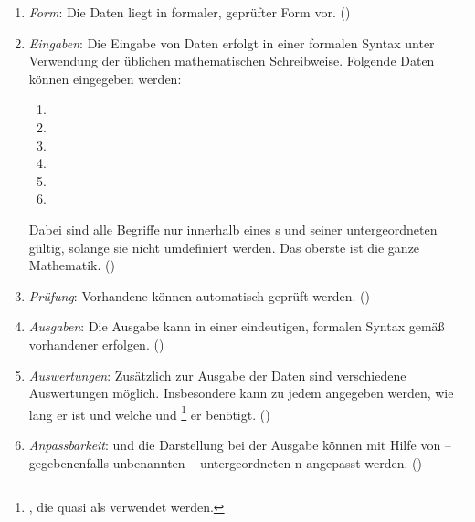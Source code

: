%
\begin{enumerate}

	\item \label{Anforderung:Form} \emph{Form}:
	Die Daten liegt in formaler, geprüfter Form vor.
	()

	\item \label{Anforderung:Eingaben} \emph{Eingaben}:
	Die Eingabe von Daten erfolgt in einer formalen Syntax unter Verwendung der üblichen mathematischen Schreibweise.
	Folgende Daten können eingegeben werden:
	\begin{enumerate}
		\item {}
		\item {}
		\item {}
		\item {}
		\item {}
		\item {}
	\end{enumerate}
	Dabei sind alle Begriffe nur innerhalb eines s und seiner untergeordneten  gültig, solange sie nicht umdefiniert werden.
	Das oberste  ist die ganze Mathematik.
	()

	\item \label{Anforderung:Prüfung} \emph{Prüfung}:
	Vorhandene  können automatisch geprüft werden.
	()

	\item \label{Anforderung:Ausgaben} \emph{Ausgaben}:
	Die Ausgabe kann in einer eindeutigen, formalen Syntax gemäß vorhandener  erfolgen.
	()

	\item \label{Anforderung:Auswertungen} \emph{Auswertungen}:
	Zusätzlich zur Ausgabe der Daten sind verschiedene Auswertungen möglich.
	Insbesondere kann zu jedem  angegeben werden, wie lang er ist und welche  und %
	\footnote{, die quasi als  verwendet werden.}
	er benötigt.
	()

	\item \label{Anforderung:Anpassbarkeit} \emph{Anpassbarkeit}:
	 und die Darstellung bei der Ausgabe können mit Hilfe von -- gegebenenfalls unbenannten -- untergeordneten n angepasst werden.
	()


\end{enumerate}
